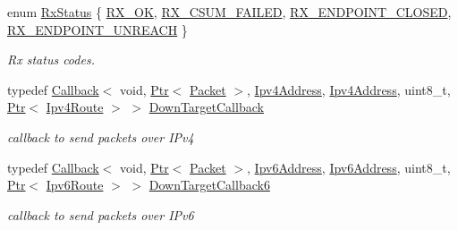 \begin{DoxyCompactItemize}
\item 
enum \hyperlink{classns3_1_1IpL4Protocol_afd3744c89902fff232e2fd45f558c80e}{Rx\+Status} \{ \hyperlink{classns3_1_1IpL4Protocol_afd3744c89902fff232e2fd45f558c80eabd979bce2f3b22521c81c4115c66317e}{R\+X\+\_\+\+OK}, 
\hyperlink{classns3_1_1IpL4Protocol_afd3744c89902fff232e2fd45f558c80eaba0111c02656760e18ca30479e297b07}{R\+X\+\_\+\+C\+S\+U\+M\+\_\+\+F\+A\+I\+L\+ED}, 
\hyperlink{classns3_1_1IpL4Protocol_afd3744c89902fff232e2fd45f558c80eac7f4577d3ab1a219d6cb2b6964c49afd}{R\+X\+\_\+\+E\+N\+D\+P\+O\+I\+N\+T\+\_\+\+C\+L\+O\+S\+ED}, 
\hyperlink{classns3_1_1IpL4Protocol_afd3744c89902fff232e2fd45f558c80ea00e3d2a534b8bd353395254c0735948b}{R\+X\+\_\+\+E\+N\+D\+P\+O\+I\+N\+T\+\_\+\+U\+N\+R\+E\+A\+CH}
 \}\begin{DoxyCompactList}\small\item\em Rx status codes. \end{DoxyCompactList}
\item 
typedef \hyperlink{classns3_1_1Callback}{Callback}$<$ void, \hyperlink{classns3_1_1Ptr}{Ptr}$<$ \hyperlink{classns3_1_1Packet}{Packet} $>$, \hyperlink{classns3_1_1Ipv4Address}{Ipv4\+Address}, \hyperlink{classns3_1_1Ipv4Address}{Ipv4\+Address}, uint8\+\_\+t, \hyperlink{classns3_1_1Ptr}{Ptr}$<$ \hyperlink{classns3_1_1Ipv4Route}{Ipv4\+Route} $>$ $>$ \hyperlink{classns3_1_1IpL4Protocol_ae3ba76c0a48fbaa90529c528a15f12b6}{Down\+Target\+Callback}
\begin{DoxyCompactList}\small\item\em callback to send packets over I\+Pv4 \end{DoxyCompactList}\item 
typedef \hyperlink{classns3_1_1Callback}{Callback}$<$ void, \hyperlink{classns3_1_1Ptr}{Ptr}$<$ \hyperlink{classns3_1_1Packet}{Packet} $>$, \hyperlink{classns3_1_1Ipv6Address}{Ipv6\+Address}, \hyperlink{classns3_1_1Ipv6Address}{Ipv6\+Address}, uint8\+\_\+t, \hyperlink{classns3_1_1Ptr}{Ptr}$<$ \hyperlink{classns3_1_1Ipv6Route}{Ipv6\+Route} $>$ $>$ \hyperlink{classns3_1_1IpL4Protocol_a039f3d1883632ab922fa958fc9ecd97f}{Down\+Target\+Callback6}
\begin{DoxyCompactList}\small\item\em callback to send packets over I\+Pv6 \end{DoxyCompactList}\end{DoxyCompactItemize}
